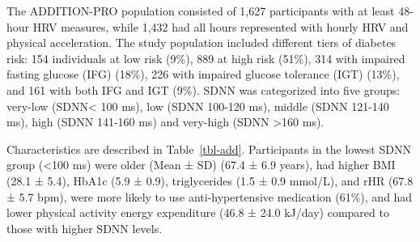 \documentclass[
  a4paper,
  headsepline=true,
  open=left]{scrbook}
\begin{document}
The ADDITION-PRO population consisted of 1,627 participants with at
least 48-hour HRV measures, while 1,432 had all hours represented with
hourly HRV and physical acceleration. The study population included
different tiers of diabetes risk: 154 individuals at low risk (9\%), 889
at high risk (51\%), 314 with impaired fasting glucose (IFG) (18\%), 226
with impaired glucose tolerance (IGT) (13\%), and 161 with both IFG and
IGT (9\%). SDNN was categorized into five groups: very-low
(SDNN\textless{} 100 ms), low (SDNN 100-120 ms), middle (SDNN 121-140
ms), high (SDNN 141-160 ms) and very-high (SDNN \textgreater160 ms).

Characteristics are described in Table~\ref{tbl-add}. Participants in
the lowest SDNN group (\textless100 ms) were older (Mean ± SD) (67.4 ±
6.9 years), had higher BMI (28.1 ± 5.4), HbA1c (5.9 ± 0.9),
triglycerides (1.5 ± 0.9 mmol/L), and rHR (67.8 ± 5.7 bpm), were more
likely to use anti-hypertensive medication (61\%), and had lower
physical activity energy expenditure (46.8 ± 24.0 kJ/day) compared to
those with higher SDNN levels.

\end{document}
